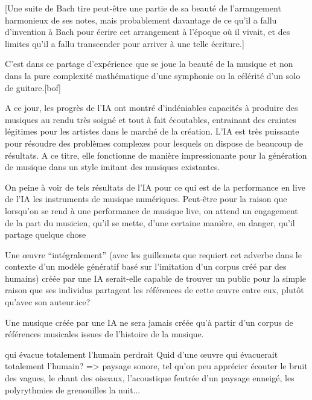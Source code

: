[Une suite de Bach tire peut-être une partie de sa beauté de l'arrangement harmonieux de ses notes, mais probablement davantage de ce qu'il a fallu d'invention à Bach pour écrire cet arrangement à l'époque où il vivait, et des limites qu'il a fallu transcender pour arriver à une telle écriture.]

C'est dans ce partage d'expérience que se joue la beauté de la musique et non dans la pure complexité mathématique d'une symphonie ou la célérité d'un solo de guitare.[bof]

A ce jour, les progrès de l'IA ont montré d'indéniables capacités à produire des musiques au rendu très soigné et tout à fait écoutables, entrainant des craintes légitimes pour les artistes dans le marché de la création. 
L'IA est très puissante pour résoudre des problèmes complexes pour lesquels on dispose de beaucoup de résultats. A ce titre, elle fonctionne de manière impressionante pour la génération de musique dans un style imitant des musiques existantes.

On peine à voir de tels résultats de l'IA pour ce qui est de la performance en live de l'IA les instruments de musique numériques.
Peut-être pour la raison que lorsqu'on se rend à une performance de musique live, on attend un engagement de la part du musicien, qu'il se mette, d'une certaine manière, en danger, qu'il partage quelque chose



Une œuvre ``intégralement'' (avec les guillemets que requiert cet adverbe dans le contexte d'un modèle génératif basé sur l'imitation d'un corpus créé par des humains) créée par une IA serait-elle capable de trouver un public pour la simple raison que ses individus partagent les références de cette œuvre entre eux, plutôt qu'avec son auteur.ice?

Une musique créée par une IA ne sera jamais créée qu'à partir d'un corpus de références musicales issues de l'histoire de la musique.

qui évacue totalement l'humain perdrait 
Quid d'une œuvre qui évacuerait totalement l'humain?
=> paysage sonore, tel qu'on peu apprécier écouter le bruit des vagues, le chant des oiseaux, l'acoustique feutrée d'un paysage enneigé, les polyrythmies de grenouilles la nuit...



